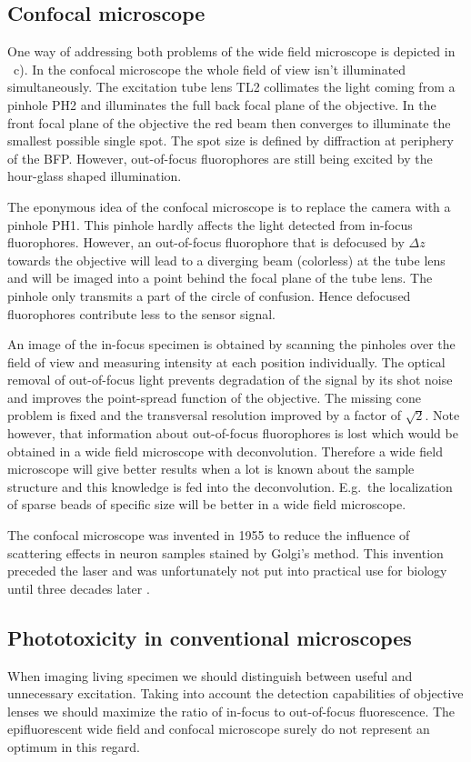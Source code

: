 \subsection{Confocal microscope}
One way of addressing both problems of the wide field microscope is
depicted in ~c). In the confocal
microscope the whole field of view isn't illuminated simultaneously.
The excitation tube lens TL2 collimates the light coming from a
pinhole PH2 and illuminates the full back focal plane of the
objective. In the front focal plane of the objective the red beam then
converges to illuminate the smallest possible single spot. The spot
size is defined by diffraction at periphery of the BFP. However,
out-of-focus fluorophores are still being excited by the hour-glass
shaped illumination.

The eponymous idea of the confocal microscope is to replace the camera
with a pinhole PH1. This pinhole hardly affects the light detected
from in-focus fluorophores. However, an out-of-focus fluorophore that
is defocused by $\Delta z$ towards the objective will lead to a
diverging beam (colorless) at the tube lens and will be imaged into a
point behind the focal plane of the tube lens. The pinhole only
transmits a part of the circle of confusion. Hence defocused
fluorophores contribute less to the sensor signal.

An image of the in-focus specimen is obtained by scanning the pinholes
over the field of view and measuring intensity at each position
individually. The optical removal of out-of-focus light prevents
degradation of the signal by its shot noise and improves the
point-spread function of the objective. The missing cone problem is
fixed and the transversal resolution improved by a factor of $\sqrt
2$. Note however, that information about out-of-focus fluorophores is
lost which would be obtained in a wide field microscope with
deconvolution. Therefore a wide field microscope will give better
results when a lot is known about the sample structure and this
knowledge is fed into the deconvolution. E.g.\ the localization of
sparse beads of specific size will be better in a wide field
microscope.

The confocal microscope was invented in 1955  \citep{Minsky1961,Minsky1988} to reduce the influence of
scattering effects in neuron samples stained by Golgi's method. This
invention preceded the laser and was unfortunately not put into
practical use for biology until three decades later \citep{Amos1987}.
\subsection{Phototoxicity in conventional microscopes}
When imaging living specimen we should distinguish between useful and
unnecessary excitation. Taking into account the detection capabilities
of objective lenses we should maximize the ratio of in-focus to
out-of-focus fluorescence. The epifluorescent wide field and confocal
microscope surely do not represent an optimum in this regard.

